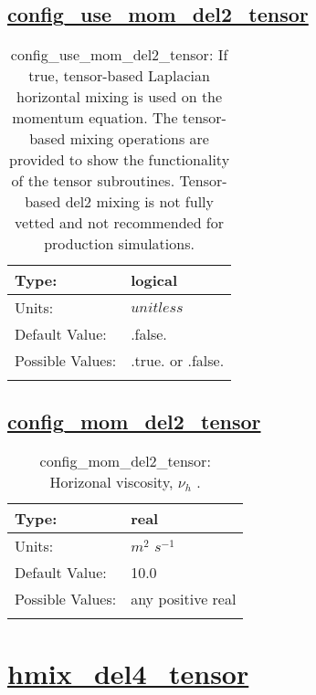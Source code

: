 \subsection[config\_use\_mom\_del2\_tensor]{\hyperref[sec:nm_tab_hmix_del2_tensor]{config\_use\_mom\_del2\_tensor}}
\label{subsec:nm_sec_config_use_mom_del2_tensor}
\begin{center}
\begin{longtable}{| p{2.0in} | p{4.0in} |}
    \hline
    Type: & logical \\
    \hline
    Units: & $unitless$ \\
    \hline
    Default Value: & .false. \\
    \hline
    Possible Values: & .true. or .false. \\
    \hline
    \caption{config\_use\_mom\_del2\_tensor: If true, tensor-based Laplacian horizontal mixing is used on the momentum equation.  The tensor-based mixing operations are provided to show the functionality of the tensor subroutines.  Tensor-based del2 mixing is not fully vetted and not recommended for production simulations.}
\end{longtable}
\end{center}
\subsection[config\_mom\_del2\_tensor]{\hyperref[sec:nm_tab_hmix_del2_tensor]{config\_mom\_del2\_tensor}}
\label{subsec:nm_sec_config_mom_del2_tensor}
\begin{center}
\begin{longtable}{| p{2.0in} | p{4.0in} |}
    \hline
    Type: & real \\
    \hline
    Units: & $m^2$ $s^{-1}$ \\
    \hline
    Default Value: & 10.0 \\
    \hline
    Possible Values: & any positive real \\
    \hline
    \caption{config\_mom\_del2\_tensor:  Horizonal viscosity,  $\nu_h$ .}
\end{longtable}
\end{center}
\section[hmix\_del4\_tensor]{\hyperref[sec:nm_tab_hmix_del4_tensor]{hmix\_del4\_tensor}}
\label{sec:nm_sec_hmix_del4_tensor}
